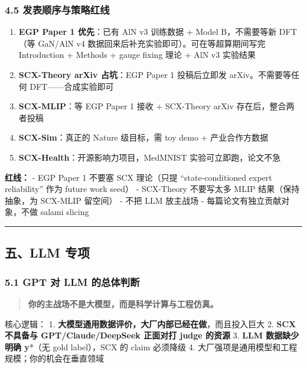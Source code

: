 \documentclass[
  12pt,
]{ctexart}
\providecommand{\tightlist}{%
  \setlength{\itemsep}{0pt}\setlength{\parskip}{0pt}}
\begin{document}
\subsubsection{4.5
发表顺序与策略红线}\label{ux53d1ux8868ux987aux5e8fux4e0eux7b56ux7565ux7ea2ux7ebf}

\begin{enumerate}
\def\labelenumi{\arabic{enumi}.}
\tightlist
\item
  \textbf{EGP Paper 1 优先}：已有 AlN v3 训练数据 + Model B，不需要等新
  DFT（等 GaN/AlN v4 数据回来后补充实验即可）。可在等超算期间写完
  Introduction + Methods + gauge fixing 理论 + AlN v3 实验结果
\item
  \textbf{SCX-Theory arXiv 占坑}：EGP Paper 1 投稿后立即发
  arXiv。不需要等任何 DFT------合成实验即可
\item
  \textbf{SCX-MLIP}：等 EGP Paper 1 接收 + SCX-Theory arXiv
  存在后，整合两者投稿
\item
  \textbf{SCX-Sim}：真正的 Nature 级目标，需 toy demo + 产业合作方数据
\item
  \textbf{SCX-Health}：开源影响力项目，MedMNIST 实验可立即跑，论文不急
\end{enumerate}

\textbf{红线：} - EGP Paper 1 不要塞 SCX 理论（只提 ``state-conditioned
expert reliability'' 作为 future work seed） - SCX-Theory 不要写太多
MLIP 结果（保持抽象，为 SCX-MLIP 留空间） - 不把 LLM 放主战场 -
每篇论文有独立贡献对象，不做 salami slicing

\begin{center}\rule{0.5\linewidth}{0.5pt}\end{center}

\subsection{五、LLM 专项}\label{ux4e94llm-ux4e13ux9879}

\subsubsection{5.1 GPT 对 LLM
的总体判断}\label{gpt-ux5bf9-llm-ux7684ux603bux4f53ux5224ux65ad}

\begin{quote}
\textbf{你的主战场不是大模型，而是科学计算与工程仿真。}
\end{quote}

核心逻辑： 1.
\textbf{大模型通用数据评价，大厂内部已经在做}，而且投入巨大 2.
\textbf{SCX 不具备与 GPT/Claude/DeepSeek 正面对打 judge 的资源} 3.
\textbf{LLM 数据缺少明确 y}*（无 gold label），SCX 的 claim 必须降级 4.
大厂强项是通用模型和工程规模；你的机会在垂直领域
\end{document}
